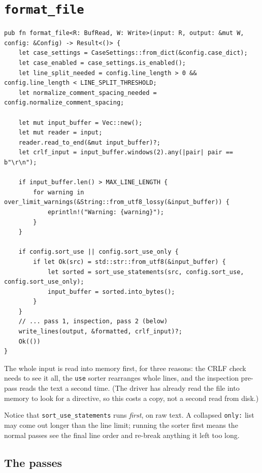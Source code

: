 \documentclass[11pt,a4paper,openany]{book}
\newcommand{\code}[1]{\texttt{\small #1}}
\begin{document}
\section{\texttt{format\_file}}

\begin{lstlisting}[style=rust]
pub fn format_file<R: BufRead, W: Write>(input: R, output: &mut W, config: &Config) -> Result<()> {
    let case_settings = CaseSettings::from_dict(&config.case_dict);
    let case_enabled = case_settings.is_enabled();
    let line_split_needed = config.line_length > 0 && config.line_length < LINE_SPLIT_THRESHOLD;
    let normalize_comment_spacing_needed = config.normalize_comment_spacing;

    let mut input_buffer = Vec::new();
    let mut reader = input;
    reader.read_to_end(&mut input_buffer)?;
    let crlf_input = input_buffer.windows(2).any(|pair| pair == b"\r\n");

    if input_buffer.len() > MAX_LINE_LENGTH {
        for warning in over_limit_warnings(&String::from_utf8_lossy(&input_buffer)) {
            eprintln!("Warning: {warning}");
        }
    }

    if config.sort_use || config.sort_use_only {
        if let Ok(src) = std::str::from_utf8(&input_buffer) {
            let sorted = sort_use_statements(src, config.sort_use, config.sort_use_only);
            input_buffer = sorted.into_bytes();
        }
    }
    // ... pass 1, inspection, pass 2 (below)
    write_lines(output, &formatted, crlf_input)?;
    Ok(())
}
\end{lstlisting}

The whole input is read into memory first, for three reasons: the CRLF check
needs to see it all, the \code{use} sorter rearranges whole lines, and the
inspection pre-pass reads the text a second time. (The driver has already read
the file into memory to look for a directive, so this costs a copy, not a
second read from disk.)

Notice that \code{sort\_use\_statements} runs \emph{first}, on raw text. A
collapsed \code{only:} list may come out longer than the line limit; running the
sorter first means the normal passes see the final line order and re-break
anything it left too long.

\subsection{The passes}
\end{document}

